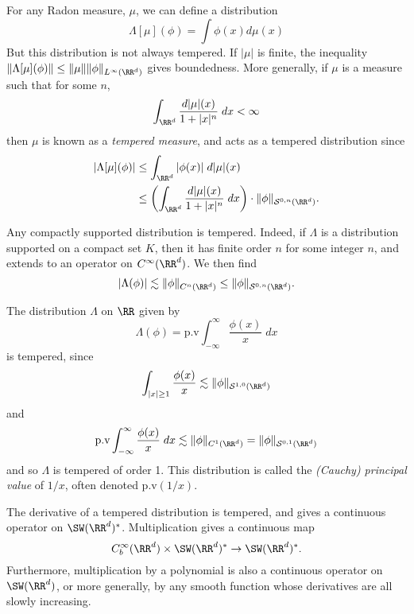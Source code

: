 \begin{example}
    For any Radon measure, $\mu$, we can define a distribution
    \[ \Lambda[\mu](\phi) = \int \phi(x) d\mu(x) \]
    But this distribution is not always tempered. If $|\mu|$ is finite, the inequality $\| \Lambda[\mu](\phi) \| \leq \| \mu \| \| \phi \|_{L^\infty(\RR^d)}$ gives boundedness. More generally, if $\mu$ is a measure such that for some $n$,
    \[ \int_{\RR^d} \frac{d|\mu|(x)}{1 + |x|^n}\; dx < \infty \]
    then $\mu$ is known as a \emph{tempered measure}, and acts as a tempered distribution since
    \begin{align*}
      |\Lambda[\mu](\phi)| &\leq \int_{\RR^d} |\phi(x)|\; d|\mu|(x)\\
      &\leq \left( \int_{\RR^d} \frac{d|\mu|(x)}{1 + |x|^n}\; dx \right) \cdot \| \phi \|_{\mathcal{S}^{0,n}(\RR^d)}.
    \end{align*}
\end{example}

\begin{example}
  Any compactly supported distribution is tempered. Indeed, if $\Lambda$ is a distribution supported on a compact set $K$, then it has finite order $n$ for some integer $n$, and extends to an operator on $C^\infty(\RR^d)$. We then find
  \[ |\Lambda(\phi)| \lesssim \| \phi \|_{C^n(\RR^d)} \leq \| \phi \|_{\mathcal{S}^{0,n}(\RR^d)}. \]
\end{example}

\begin{example}
  The distribution $\Lambda$ on $\RR$ given by
  \[ \Lambda(\phi) = \text{p.v} \int_{-\infty}^\infty \frac{\phi(x)}{x}\; dx \]
  is tempered, since
  \[ \int_{|x| \geq 1} \frac{\phi(x)}{x} \lesssim \| \phi \|_{\mathcal{S}^{1,0}(\RR^d)} \]
  and
  \[ \text{p.v} \int_{-\infty}^\infty \frac{\phi(x)}{x}\; dx \lesssim \| \phi \|_{C^1(\RR^d)} = \| \phi \|_{\mathcal{S}^{0,1}(\RR^d)} \]
  and so $\Lambda$ is tempered of order 1. This distribution is called the \emph{(Cauchy) principal value} of $1/x$, often denoted $\text{p.v}(1/x)$.
\end{example}

The derivative of a tempered distribution is tempered, and gives a continuous operator on $\SW(\RR^d)^*$. Multiplication gives a continuous map
%
\[ C^\infty_b(\RR^d) \times \SW(\RR^d)^* \to \SW(\RR^d)^*. \]
%
Furthermore, multiplication by a polynomial is also a continuous operator on $\SW(\RR^d)$, or more generally, by any smooth function whose derivatives are all slowly increasing.

